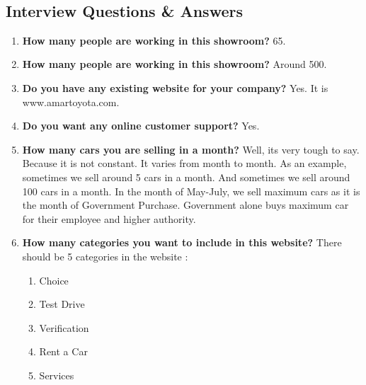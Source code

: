 \noindent \\


\noindent 

\newpage 

\subsection{ Interview Questions \& Answers }
\begin{enumerate}
    \item \textbf{How many people are working in this showroom?}
    \noindent \textbf{}65.
    
    \item \textbf{How many people are working in this showroom?}\newline
    \noindent \textbf{}Around 500.
    
     \item \textbf{Do you have any existing website for your company?}\newline
    \noindent \textbf{}Yes. It is www.amartoyota.com.
    
    \item \textbf{Do you want any online customer support?}\newline
    \noindent \textbf{}Yes. 
    
    \item \textbf{How many cars you are selling in a month?}\newline
    \noindent \textbf{}Well, its very tough to say. Because it is not constant. It varies from month to month. As an example, sometimes we sell around 5 cars in a month. And sometimes we sell around 100 cars in a month. In the month of May-July, we sell maximum cars as it is the month of Government Purchase. Government alone buys maximum car for their employee and higher authority.

    
    \item \textbf{How many categories you want to include in this website?}\newline
    \noindent \textbf{} There should be 5 categories in the website :\newline
	\begin{enumerate}
		\item Choice
		\item Test Drive
		\item Verification
		\item Rent a Car
		\item Services
	\end{enumerate}
    

\end{enumerate}
